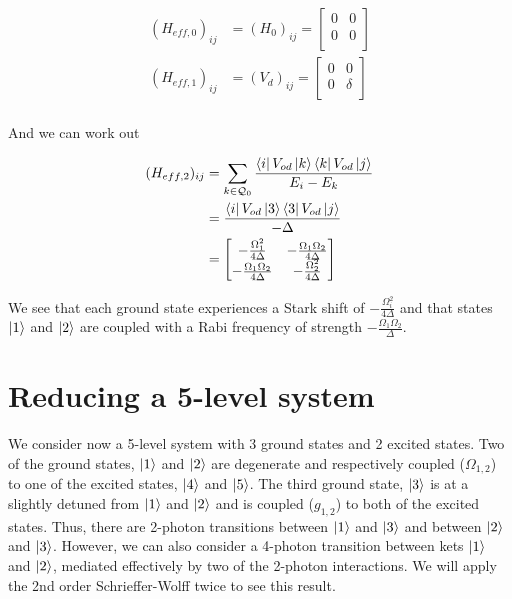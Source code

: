 \documentclass[12pt]{article}
\begin{document}
\begin{equation}
\begin{split}
(H_{eff,0})_{ij} &= (H_0)_{ij} = \begin{bmatrix}
0 & 0\\
0 & 0\\
\end{bmatrix}\\ 
(H_{eff,1})_{ij} &= (V_d)_{ij} = \begin{bmatrix}
0 & 0\\
0 & \delta\\
\end{bmatrix}\\
\end{split}
\end{equation}

And we can work out

\begin{equation}
\begin{split}
(H_{eff,2})_{ij} &= \sum_{k \in \mathcal{Q}_0} \frac{\bra{i}V_{od}\ket{k}\bra{k}V_{od}\ket{j}}{E_i-E_k} \\
&=  \frac{\bra{i}V_{od}\ket{3}\bra{3}V_{od}\ket{j}}{-\Delta}\\
&= \begin{bmatrix}
-\frac{\Omega_1^2}{4\Delta} & - \frac{\Omega_1\Omega_2}{4\Delta}\\
-\frac{\Omega_1\Omega_2}{4\Delta} & -\frac{\Omega_2^2}{4\Delta}
\end{bmatrix}
\end{split}
\end{equation}

We see that each ground state experiences a Stark shift of $-\frac{\Omega_i^2}{4\Delta}$ and that states $\ket{1}$ and $\ket{2}$ are coupled with a Rabi frequency of strength $-\frac{\Omega_1 \Omega_2}{\Delta}$.

\section{Reducing a 5-level system}

We consider now a 5-level system with 3 ground states and 2 excited states. Two of the ground states, $\ket{1}$ and $\ket{2}$ are degenerate and respectively coupled ($\Omega_{1,2}$) to one of the excited states, $\ket{4}$ and $\ket{5}$. The third ground state, $\ket{3}$ is at a slightly detuned from $\ket{1}$ and $\ket{2}$ and is coupled ($g_{1,2}$)
to both of the excited states. Thus, there are 2-photon transitions between $\ket{1}$ and $\ket{3}$ and between $\ket{2}$ and $\ket{3}$. However, we can also consider a 4-photon transition between kets $\ket{1}$ and $\ket{2}$, mediated effectively by two of the 2-photon interactions. We will apply the 2nd order Schrieffer-Wolff twice to see this result.
\end{document}
